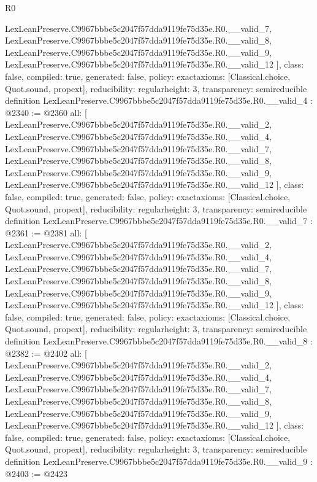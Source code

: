 \begin{lexlean}{R0}
\begin{coremodule}
{    LexLeanPreserve.C9967bbbe5c2047f57dda9119fe75d35e.R0.__valid_7,
    LexLeanPreserve.C9967bbbe5c2047f57dda9119fe75d35e.R0.__valid_8,
    LexLeanPreserve.C9967bbbe5c2047f57dda9119fe75d35e.R0.__valid_9,
    LexLeanPreserve.C9967bbbe5c2047f57dda9119fe75d35e.R0.__valid_12
  ],
  class: false,
  compiled: true,
  generated: false,
  policy: exact{axioms: [Classical.choice, Quot.sound, propext]},
  reducibility: regular{height: 3},
  transparency: semireducible
}
definition LexLeanPreserve.C9967bbbe5c2047f57dda9119fe75d35e.R0.__valid_4 : @2340 := @2360 {
  all: [
    LexLeanPreserve.C9967bbbe5c2047f57dda9119fe75d35e.R0.__valid_2,
    LexLeanPreserve.C9967bbbe5c2047f57dda9119fe75d35e.R0.__valid_4,
    LexLeanPreserve.C9967bbbe5c2047f57dda9119fe75d35e.R0.__valid_7,
    LexLeanPreserve.C9967bbbe5c2047f57dda9119fe75d35e.R0.__valid_8,
    LexLeanPreserve.C9967bbbe5c2047f57dda9119fe75d35e.R0.__valid_9,
    LexLeanPreserve.C9967bbbe5c2047f57dda9119fe75d35e.R0.__valid_12
  ],
  class: false,
  compiled: true,
  generated: false,
  policy: exact{axioms: [Classical.choice, Quot.sound, propext]},
  reducibility: regular{height: 3},
  transparency: semireducible
}
definition LexLeanPreserve.C9967bbbe5c2047f57dda9119fe75d35e.R0.__valid_7 : @2361 := @2381 {
  all: [
    LexLeanPreserve.C9967bbbe5c2047f57dda9119fe75d35e.R0.__valid_2,
    LexLeanPreserve.C9967bbbe5c2047f57dda9119fe75d35e.R0.__valid_4,
    LexLeanPreserve.C9967bbbe5c2047f57dda9119fe75d35e.R0.__valid_7,
    LexLeanPreserve.C9967bbbe5c2047f57dda9119fe75d35e.R0.__valid_8,
    LexLeanPreserve.C9967bbbe5c2047f57dda9119fe75d35e.R0.__valid_9,
    LexLeanPreserve.C9967bbbe5c2047f57dda9119fe75d35e.R0.__valid_12
  ],
  class: false,
  compiled: true,
  generated: false,
  policy: exact{axioms: [Classical.choice, Quot.sound, propext]},
  reducibility: regular{height: 3},
  transparency: semireducible
}
definition LexLeanPreserve.C9967bbbe5c2047f57dda9119fe75d35e.R0.__valid_8 : @2382 := @2402 {
  all: [
    LexLeanPreserve.C9967bbbe5c2047f57dda9119fe75d35e.R0.__valid_2,
    LexLeanPreserve.C9967bbbe5c2047f57dda9119fe75d35e.R0.__valid_4,
    LexLeanPreserve.C9967bbbe5c2047f57dda9119fe75d35e.R0.__valid_7,
    LexLeanPreserve.C9967bbbe5c2047f57dda9119fe75d35e.R0.__valid_8,
    LexLeanPreserve.C9967bbbe5c2047f57dda9119fe75d35e.R0.__valid_9,
    LexLeanPreserve.C9967bbbe5c2047f57dda9119fe75d35e.R0.__valid_12
  ],
  class: false,
  compiled: true,
  generated: false,
  policy: exact{axioms: [Classical.choice, Quot.sound, propext]},
  reducibility: regular{height: 3},
  transparency: semireducible
}
definition LexLeanPreserve.C9967bbbe5c2047f57dda9119fe75d35e.R0.__valid_9 : @2403 := @2423 {
}
\end{coremodule}
\end{lexlean}

